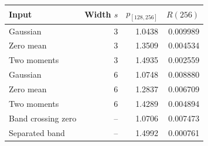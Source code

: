 \begin{tabular}{lrrr}\toprule Input & Width $s$ & $p_{[128,256]}$ & $R(256)$\\\midrule
Gaussian & 3 & 1.0438 & 0.009989 \\
Zero mean & 3 & 1.3509 & 0.004534 \\
Two moments & 3 & 1.4935 & 0.002559 \\
Gaussian & 6 & 1.0748 & 0.008880 \\
Zero mean & 6 & 1.2837 & 0.006709 \\
Two moments & 6 & 1.4289 & 0.004894 \\
Band crossing zero & -- & 1.0706 & 0.007473 \\
Separated band & -- & 1.4992 & 0.000761 \\
\bottomrule\end{tabular}